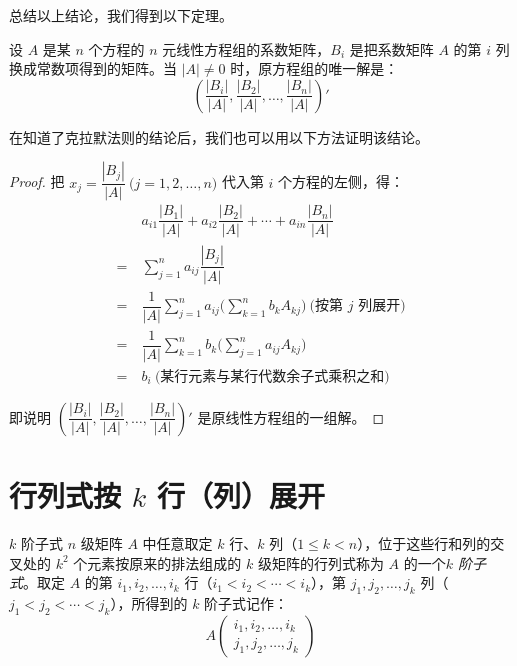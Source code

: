 总结以上结论，我们得到以下定理。

\begin{theorem}[克拉默法则]
	设 $A$ 是某 $n$ 个方程的 $n$ 元线性方程组的系数矩阵，$B_i$ 是把系数矩阵 $A$ 的第 $i$ 列换成常数项得到的矩阵。当 $|A| \ne 0$ 时，原方程组的唯一解是：
	$$
	\left( \dfrac{|B_i|}{|A|}, \dfrac{|B_2|}{|A|}, \ldots, \dfrac{|B_n|}{|A|} \right)'
	$$
\end{theorem}

在知道了克拉默法则的结论后，我们也可以用以下方法证明该结论。

\begin{proof}
	把 $x_j = \dfrac{|B_j|}{|A|} \pod{j = 1, 2, \ldots, n}$ 代入第 $i$ 个方程的左侧，得：
	$$
	\begin{aligned}&
		a_{i1} \dfrac{|B_1|}{|A|} + a_{i2} \dfrac{|B_2|}{|A|} + \cdots + a_{in} \dfrac{|B_n|}{|A|}
		\\=~&
		\sum\limits_{j = 1}^n a_{ij} \dfrac{|B_j|}{|A|}
		\\=~&
		\dfrac{1}{|A|} \sum\limits_{j = 1}^n a_{ij} \biggl( \sum\limits_{k = 1}^n b_k A_{kj} \biggr) \pod{\text{按第 $j$ 列展开}}
		\\=~&
		\dfrac{1}{|A|} \sum\limits_{k = 1}^n b_k \biggl( \sum\limits_{j = 1}^n a_{ij} A_{kj} \biggr)
		\\=~&
		b_i \pod{\text{某行元素与某行代数余子式乘积之和}}
	\end{aligned}
	$$

	即说明 $\left( \dfrac{|B_i|}{|A|}, \dfrac{|B_2|}{|A|}, \ldots, \dfrac{|B_n|}{|A|} \right)'$ 是原线性方程组的一组解。
\end{proof}

\section{行列式按 $k$ 行（列）展开}

\begin{definition}{$k$ 阶子式}
	$n$ 级矩阵 $A$ 中任意取定 $k$ 行、$k$ 列（$1 \le k < n$），位于这些行和列的交叉处的 $k^2$ 个元素按原来的排法组成的 $k$ 级矩阵的行列式称为 $A$ 的一个\emph{$k$ 阶子式}。取定 $A$ 的第 $i_1, i_2, \ldots, i_k$ 行（$i_1 < i_2 < \cdots < i_k$），第 $j_1, j_2, \ldots, j_k$ 列（$j_1 < j_2 < \cdots < j_k$），所得到的 $k$ 阶子式记作：
	$$
	A \begin{pmatrix} i_1, i_2, \ldots, i_k \\ j_1, j_2, \ldots, j_k \end{pmatrix}
	$$
\end{definition}


